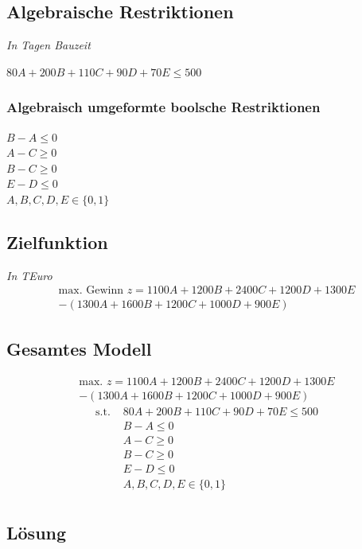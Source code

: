 \documentclass[a4paper,11pt]{article}
\begin{document}
\subsection*{Algebraische Restriktionen}
\textit{In Tagen Bauzeit} \newline

$80A + 200B + 110C + 90D + 70E \le 500$

\subsubsection*{Algebraisch umgeformte boolsche Restriktionen}
$B - A \le 0$ \\
$A - C \ge 0$ \\
$B - C \ge 0$ \\
$E - D \le 0$ \\
$A, B, C, D, E \in \{0, 1\}$ \\


\subsection*{Zielfunktion}
\textit{In TEuro} \\
\begin{multline*}
\text{max. Gewinn } z = 1100A + 1200B + 2400C + 1200D + 1300E\\ - (1300A + 1600B + 1200C + 1000D + 900E)
\end{multline*}

\subsection*{Gesamtes Modell}
\begin{multline*}
    \text{max. } z = 1100A + 1200B + 2400C + 1200D + 1300E\\ - (1300A + 1600B + 1200C + 1000D + 900E)
\end{multline*}
\begin{align*}
\text{s.t. } & 80A + 200B + 110C + 90D + 70E \le 500 \\
& B - A \le 0 \\
& A - C \ge 0 \\
& B - C \ge 0 \\
& E - D \le 0 \\
& A, B, C, D, E \in \{0, 1\} \\
\end{align*}

\subsection*{Lösung}
\end{document}
